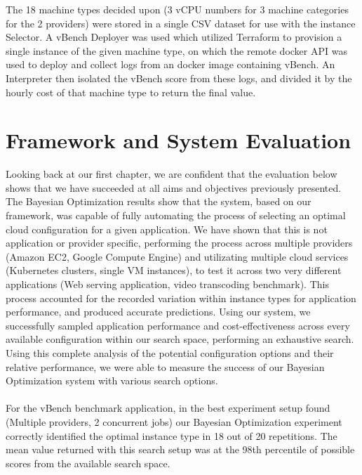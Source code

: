 \documentclass{report}
\begin{document}
The 18 machine types decided upon (3 vCPU numbers for 3 machine categories for the 2 providers) were stored in a single CSV dataset for use with the instance Selector. A vBench Deployer was used which utilized Terraform to provision a single instance of the given machine type, on which the remote docker API was used to deploy and collect logs from an docker image containing vBench. An Interpreter then isolated the vBench score from these logs, and divided it by the hourly cost of that machine type to return the final value.

\section{Framework and System Evaluation}
Looking back at our first chapter, we are confident that the evaluation below shows that we have succeeded at all aims and objectives previously presented. The Bayesian Optimization results show that the system, based on our framework, was capable of fully automating the process of selecting an optimal cloud configuration for a given application. We have shown that this is not application or provider specific, performing the process across multiple providers (Amazon EC2, Google Compute Engine) and utilizating multiple cloud services (Kubernetes clusters, single VM instances), to test it across two very different applications (Web serving application, video transcoding benchmark). This process accounted for the recorded variation within instance types for application performance, and produced accurate predictions. Using our system, we successfully sampled application performance and cost-effectiveness across every available configuration within our search space, performing an exhaustive search. Using this complete analysis of the potential configuration options and their relative performance, we were able to measure the success of our Bayesian Optimization system with various search options.

\paragraph{}

For the vBench benchmark application, in the best experiment setup found (Multiple providers, 2 concurrent jobs) our Bayesian Optimization experiment correctly identified the optimal instance type in 18 out of 20 repetitions. The mean value returned with this search setup was at the 98th percentile of possible scores from the available search space.
\end{document}
